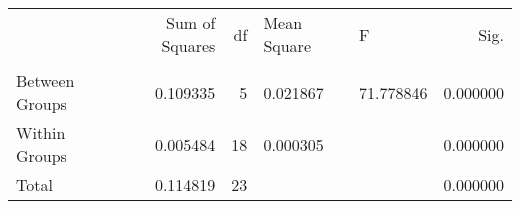 \begin{tabular}{lrrllr}
\toprule
 & Sum of Squares & df & Mean Square & F & Sig. \\
 &  &  &  &  &  \\
\midrule
Between Groups & 0.109335 & 5 & 0.021867 & 71.778846 & 0.000000 \\
Within Groups & 0.005484 & 18 & 0.000305 &  & 0.000000 \\
Total & 0.114819 & 23 &  &  & 0.000000 \\
\bottomrule
\end{tabular}
